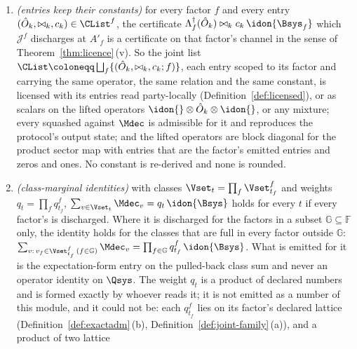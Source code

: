 \begin{theorem}
\begin{enumerate}[label=(\roman*),leftmargin=3.0em]
  projectors, $\PinS\circ\Lambda=\Lambda$, and the squashed
  analysis may be restricted to states block diagonal for the product sector
  map without excluding a reachable one. The transported set contains every
  product projector $\Pi_s$, every lifted projector
  $\idon{}\otimes\Pi^{f}_{s_f}\otimes\idon{}$ and every lifted transported
  operator $\idon{}\otimes\hat O\otimes\idon{}$, $\hat O$ transported by
  $\mathcal{J}^{f}$, with pull-back the lift of $\hat O$'s pull-back.
\item \emph{(entries keep their constants)} for every factor $f$ and every
  entry $(\hat O_k,\bowtie_k,c_k)\in\CList^{f}$, the certificate
  $\Lambda_f^{\dagger}(\hat O_k)\bowtie_kc_k\,\idon{\Bsys_f}$ which
  $\mathcal{J}^{f}$ discharges at $A'_f$ is a certificate on that factor's
  channel in the sense of Theorem~\ref{thm:licence}\,(v). So the joint list
  $\CList\coloneqq\bigsqcup_f\{(\hat O_k,\bowtie_k,c_k;f)\}$, each entry
  scoped to its factor and carrying the same operator, the same relation and
  the same constant, is licensed with its entries read party-locally
  (Definition~\ref{def:licensed}), or as scalars on the lifted operators
  $\idon{}\otimes\hat O_k\otimes\idon{}$, or any mixture; every squashed
   against $\Mdec$ is admissible for it and reproduces
  the protocol's output state; and the lifted operators are block diagonal
  for the product sector map with entries that are the factor's emitted
  entries and zeros and ones. No constant is re-derived and none is rounded.
\item \emph{(class-marginal identities)} with classes
  $\Vset_{t}=\prod_f\Vset^{f}_{t_f}$ and weights $q_t=\prod_fq^{f}_{t_f}$,
  $\sum_{v\in\Vset_t}\Mdec_v=q_t\,\idon{\Bsys}$ holds for every $t$ if every
  factor's  is discharged. Where it is
  discharged for the factors in a subset $\mathbb{G}\subseteq\mathbb{F}$ only,
  the identity holds for the classes that are full in every factor outside
  $\mathbb{G}$:
  $\sum_{v:\,v_f\in\Vset^{f}_{t_f}\,(f\in\mathbb{G})}\Mdec_v
  =\prod_{f\in\mathbb{G}}q^{f}_{t_f}\,\idon{\Bsys}$. What is emitted for it
  is the expectation-form
  entry on the pulled-back class sum and never an operator identity on
  $\Qsys$. The weight $q_t$ is a product of declared numbers and is formed
  exactly by whoever reads it; it is not emitted as a number of this module,
  and it could not be: each $q^{f}_{t_f}$ lies on its factor's declared
  lattice (Definition~\ref{def:exactadm}\,(b),
  Definition~\ref{def:joint-family}\,(a)), and a product of two lattice

\end{enumerate}
\end{theorem}

